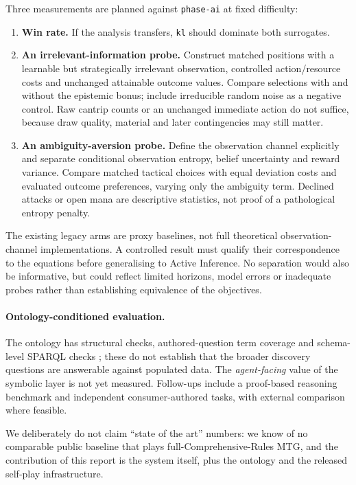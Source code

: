 \documentclass[11pt,a4paper]{article}
\theoremstyle{definition}
\theoremstyle{plain}
\begin{document}
Three measurements are planned against \texttt{phase-ai} at fixed difficulty:
\begin{enumerate}[leftmargin=1.2em, itemsep=1pt]
  \item \textbf{Win rate.} If the analysis transfers, \texttt{kl} should dominate both surrogates.
  \item \textbf{An irrelevant-information probe.} Construct matched positions with a learnable but strategically irrelevant observation, controlled action/resource costs and unchanged attainable outcome values. Compare selections with and without the epistemic bonus; include irreducible random noise as a negative control. Raw cantrip counts or an unchanged immediate action do not suffice, because draw quality, material and later contingencies may still matter.
  \item \textbf{An ambiguity-aversion probe.} Define the observation channel explicitly and separate conditional observation entropy, belief uncertainty and reward variance. Compare matched tactical choices with equal deviation costs and evaluated outcome preferences, varying only the ambiguity term. Declined attacks or open mana are descriptive statistics, not proof of a pathological entropy penalty.
\end{enumerate}
The existing legacy arms are proxy baselines, not full theoretical observation-channel implementations. A controlled result must qualify their correspondence to the equations before generalising to Active Inference. No separation would also be informative, but could reflect limited horizons, model errors or inadequate probes rather than establishing equivalence of the objectives.

\paragraph{Ontology-conditioned evaluation.}
The ontology has structural checks, authored-question term coverage and schema-level SPARQL checks \citep{neuburger2026ontology}; these do not establish that the broader discovery questions are answerable against populated data. The \emph{agent-facing} value of the symbolic layer is not yet measured. Follow-ups include a proof-based reasoning benchmark and independent consumer-authored tasks, with external comparison where feasible.

We deliberately do not claim ``state of the art'' numbers: we know of no comparable public baseline that plays full-Comprehensive-Rules MTG, and the contribution of this report is the system itself, plus the ontology and the released self-play infrastructure.
\end{document}
